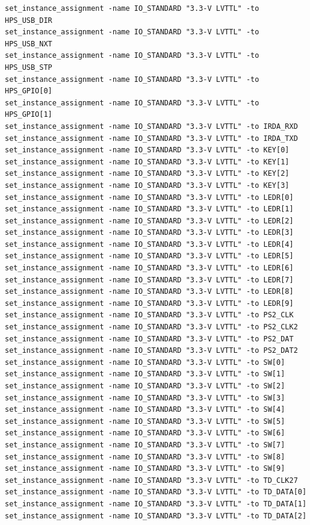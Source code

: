 \documentclass[conference]{IEEEtran}
\begin{document}
\begin{lstlisting}
set_instance_assignment -name IO_STANDARD "3.3-V LVTTL" -to HPS_USB_DIR
set_instance_assignment -name IO_STANDARD "3.3-V LVTTL" -to HPS_USB_NXT
set_instance_assignment -name IO_STANDARD "3.3-V LVTTL" -to HPS_USB_STP
set_instance_assignment -name IO_STANDARD "3.3-V LVTTL" -to HPS_GPIO[0]
set_instance_assignment -name IO_STANDARD "3.3-V LVTTL" -to HPS_GPIO[1]
set_instance_assignment -name IO_STANDARD "3.3-V LVTTL" -to IRDA_RXD
set_instance_assignment -name IO_STANDARD "3.3-V LVTTL" -to IRDA_TXD
set_instance_assignment -name IO_STANDARD "3.3-V LVTTL" -to KEY[0]
set_instance_assignment -name IO_STANDARD "3.3-V LVTTL" -to KEY[1]
set_instance_assignment -name IO_STANDARD "3.3-V LVTTL" -to KEY[2]
set_instance_assignment -name IO_STANDARD "3.3-V LVTTL" -to KEY[3]
set_instance_assignment -name IO_STANDARD "3.3-V LVTTL" -to LEDR[0]
set_instance_assignment -name IO_STANDARD "3.3-V LVTTL" -to LEDR[1]
set_instance_assignment -name IO_STANDARD "3.3-V LVTTL" -to LEDR[2]
set_instance_assignment -name IO_STANDARD "3.3-V LVTTL" -to LEDR[3]
set_instance_assignment -name IO_STANDARD "3.3-V LVTTL" -to LEDR[4]
set_instance_assignment -name IO_STANDARD "3.3-V LVTTL" -to LEDR[5]
set_instance_assignment -name IO_STANDARD "3.3-V LVTTL" -to LEDR[6]
set_instance_assignment -name IO_STANDARD "3.3-V LVTTL" -to LEDR[7]
set_instance_assignment -name IO_STANDARD "3.3-V LVTTL" -to LEDR[8]
set_instance_assignment -name IO_STANDARD "3.3-V LVTTL" -to LEDR[9]
set_instance_assignment -name IO_STANDARD "3.3-V LVTTL" -to PS2_CLK
set_instance_assignment -name IO_STANDARD "3.3-V LVTTL" -to PS2_CLK2
set_instance_assignment -name IO_STANDARD "3.3-V LVTTL" -to PS2_DAT
set_instance_assignment -name IO_STANDARD "3.3-V LVTTL" -to PS2_DAT2
set_instance_assignment -name IO_STANDARD "3.3-V LVTTL" -to SW[0]
set_instance_assignment -name IO_STANDARD "3.3-V LVTTL" -to SW[1]
set_instance_assignment -name IO_STANDARD "3.3-V LVTTL" -to SW[2]
set_instance_assignment -name IO_STANDARD "3.3-V LVTTL" -to SW[3]
set_instance_assignment -name IO_STANDARD "3.3-V LVTTL" -to SW[4]
set_instance_assignment -name IO_STANDARD "3.3-V LVTTL" -to SW[5]
set_instance_assignment -name IO_STANDARD "3.3-V LVTTL" -to SW[6]
set_instance_assignment -name IO_STANDARD "3.3-V LVTTL" -to SW[7]
set_instance_assignment -name IO_STANDARD "3.3-V LVTTL" -to SW[8]
set_instance_assignment -name IO_STANDARD "3.3-V LVTTL" -to SW[9]
set_instance_assignment -name IO_STANDARD "3.3-V LVTTL" -to TD_CLK27
set_instance_assignment -name IO_STANDARD "3.3-V LVTTL" -to TD_DATA[0]
set_instance_assignment -name IO_STANDARD "3.3-V LVTTL" -to TD_DATA[1]
set_instance_assignment -name IO_STANDARD "3.3-V LVTTL" -to TD_DATA[2]

\end{lstlisting}
\end{document}

